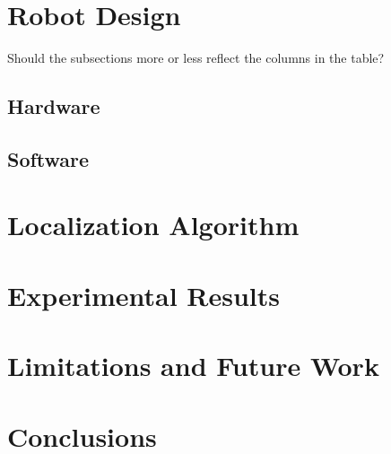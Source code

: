\documentclass[letterpaper, 10 pt, conference]{ieeeconf}  %
\begin{document}



\section{Robot Design}

Should the subsections more or less reflect the columns in the table?

\subsection{Hardware}

\subsection{Software}


\section{Localization Algorithm}

\section{Experimental Results}

\section{Limitations and Future Work}


\section{Conclusions}
\end{document}
